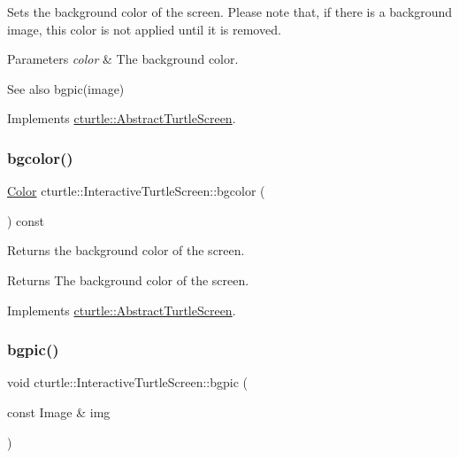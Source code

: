 Sets the background color of the screen. Please note that, if there is a background image, this color is not applied until it is removed. 
\begin{DoxyParams}{Parameters}
{\em color} & The background color. \\
\hline
\end{DoxyParams}
\begin{DoxySeeAlso}{See also}
bgpic(image) 
\end{DoxySeeAlso}


Implements \hyperlink{classcturtle_1_1AbstractTurtleScreen}{cturtle\+::\+Abstract\+Turtle\+Screen}.

\mbox{\label{classcturtle_1_1InteractiveTurtleScreen_a55289593218ba99904f7957700ef7dae}} 
\subsubsection{\texorpdfstring{bgcolor()}{bgcolor()}\hspace{0.1cm}{\footnotesize\ttfamily [2/2]}}
{\footnotesize\ttfamily \hyperlink{classcturtle_1_1Color}{Color} cturtle\+::\+Interactive\+Turtle\+Screen\+::bgcolor (\begin{DoxyParamCaption}{ }\end{DoxyParamCaption}) const\hspace{0.3cm}{\ttfamily [virtual]}}

Returns the background color of the screen. \begin{DoxyReturn}{Returns}
The background color of the screen. 
\end{DoxyReturn}


Implements \hyperlink{classcturtle_1_1AbstractTurtleScreen}{cturtle\+::\+Abstract\+Turtle\+Screen}.

\mbox{\label{classcturtle_1_1InteractiveTurtleScreen_af681fbd6140ea760204fa9a1766725e3}} 
\subsubsection{\texorpdfstring{bgpic()}{bgpic()}\hspace{0.1cm}{\footnotesize\ttfamily [1/2]}}
{\footnotesize\ttfamily void cturtle\+::\+Interactive\+Turtle\+Screen\+::bgpic (\begin{DoxyParamCaption}\item[{const Image \&}]{img }\end{DoxyParamCaption})}



